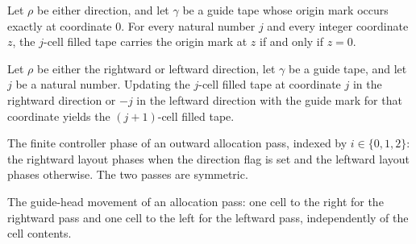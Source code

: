 \begin{lemma}
\label{Complexity.guideFill_origin}
\leanok
{}
Let $\rho$ be either direction, and let $\gamma$ be a guide tape whose origin mark
occurs exactly at coordinate $0$. For every natural number $j$ and every integer
coordinate $z$, the $j$-cell filled tape carries the origin mark at $z$ if and only if
$z=0$.
\end{lemma}

\begin{lemma}
\label{Complexity.guideFill_next}
\leanok
{}
Let $\rho$ be either the rightward or leftward direction, let $\gamma$ be a guide tape,
and let $j$ be a natural number. Updating the $j$-cell filled tape at coordinate $j$ in
the rightward direction or $-j$ in the leftward direction with the guide mark for that
coordinate yields the $(j+1)$-cell filled tape.
\end{lemma}

\begin{definition}
\label{Complexity.layoutPhase}
\leanok
{}
The finite controller phase of an outward allocation pass, indexed by
$i \in \{0,1,2\}$: the rightward layout phases when the direction flag is set and the
leftward layout phases otherwise.  The two passes are symmetric.
\end{definition}

\begin{definition}
\label{Complexity.layoutMove}
\leanok
The guide-head movement of an allocation pass: one cell to the right for the rightward
pass and one cell to the left for the leftward pass, independently of the cell
contents.
\end{definition}

